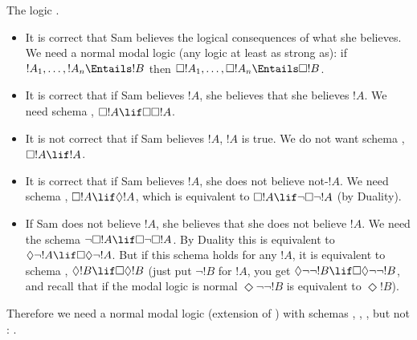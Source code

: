 \documentclass[../../../../include/open-logic-section]{subfiles}
\begin{document}
\begin{prob}
\begin{ans}
	The logic . 
	\begin{itemize}
		\item
	It is correct that Sam believes the logical consequences 
	of what she believes. We need a normal modal logic (any logic 
	at least as strong as): if $!A_1,\ldots,!A_n\Entails!B$
	then $\Box!A_1,\ldots,\Box!A_n\Entails\Box!B$. 
		\item It is correct that if Sam believes $!A$, 
		she believes that she believes $!A$. We need schema , 
		$\Box!A\lif\Box\Box!A$.
		\item It is not correct that if Sam believes $!A$, $!A$ is 
		true. We do not want schema , $\Box!A\lif!A$.
		\item It is correct that if Sam believes $!A$, she does not 
		believe not-$!A$. We need schema , $\Box!A\lif\Diamond!A$, 
		which is equivalent to $\Box!A\lif\lnot\Box\lnot!A$ (by Duality).
		\item If Sam does not believe $!A$, she believes that she does
		not believe $!A$. We need the schema
		$\lnot\Box!A\lif\Box\lnot\Box!A$. By Duality this is
		equivalent to $\Diamond\lnot!A\lif\Box\Diamond\lnot!A$. But if
		this schema holds for any $!A$, it is equivalent to schema
		, $\Diamond!B\lif\Box\Diamond!B$ (just put $\lnot!B$ for
		$!A$, you get
		$\Diamond\lnot\lnot!B\lif\Box\Diamond\lnot\lnot!B$, and recall
		that if the modal logic is normal $\Diamond\lnot\lnot!B$ is
		equivalent to $\Diamond!B$).
	\end{itemize}
	Therefore we need a normal modal logic (extension of ) with
	schemas , , , but not : . 
\end{ans}
\end{prob}
\end{document}
